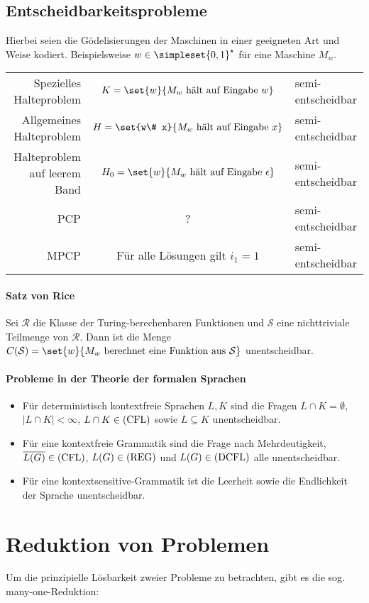 \subsection{Entscheidbarkeitsprobleme}
Hierbei seien die Gödelisierungen der Maschinen in einer geeigneten Art und Weise kodiert. Beispielsweise $w\in\simpleset{0,1}^\star$ für eine Maschine $M_w$.
\medskip

\begin{tabular}{r|c|l}
	Spezielles Halteproblem & $K=\set{w}{M_w \text{ hält auf Eingabe } w}$ & semi-entscheidbar\\
	Allgemeines Halteproblem & $H=\set{w\# x}{M_w \text{ hält auf Eingabe } x}$ & semi-entscheidbar\\
	Halteproblem auf leerem Band & $H_0=\set{w}{M_w \text{ hält auf Eingabe } \epsilon}$ & semi-entscheidbar\\
	PCP & ? & semi-entscheidbar\\
	MPCP & Für alle Lösungen gilt $i_1=1$ & semi-entscheidbar
\end{tabular}

\paragraph{Satz von Rice}
Sei $\mathcal R$ die Klasse der Turing-berechenbaren Funktionen und $\mathcal S$ eine nichttriviale Teilmenge von $\mathcal R$.
Dann ist die Menge $C(\mathcal S)=\set{w}{M_w \text{ berechnet eine Funktion aus } \mathcal S}$ unentscheidbar.

\paragraph{Probleme in der Theorie der formalen Sprachen}
\begin{itemize}
	\item Für deterministisch kontextfreie Sprachen $L,K$ sind die Fragen $L\cap K=\emptyset$, $|L\cap K|<\infty$, $L\cap K \in \mathrm{(CFL)}$ sowie $L\subseteq K$ unentscheidbar.
	\item Für eine kontextfreie Grammatik sind die Frage nach Mehrdeutigkeit, $\overline{L(G)}\in\mathrm{(CFL)}$, $L(G)\in \mathrm{(REG)}$ und $L(G)\in \mathrm{(DCFL)}$ alle unentscheidbar.
	\item Für eine kontextsensitive-Grammatik ist die Leerheit sowie die Endlichkeit der Sprache unentscheidbar.
\end{itemize}

\section{Reduktion von Problemen}
Um die prinzipielle Lösbarkeit zweier Probleme zu betrachten, gibt es die sog. many-one-Reduktion:

